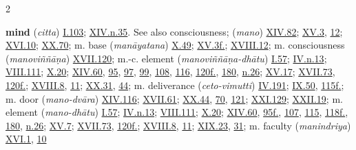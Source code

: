 \begin{multicols}{2}
\begin{vismHanging}
\par\textbf{mind} (\emph{citta}) \hyperlink{I.103}{I.103}{}; \hyperlink{XIV.n35}{XIV.n.35}{}. See also consciousness; (\emph{mano}) \hyperlink{XIV.82}{XIV.82}{}; \hyperlink{XV.3}{XV.3}{}, \hyperlink{XV.12}{12}{}; \hyperlink{XVI.10}{XVI.10}{}; \hyperlink{XX.70}{XX.70}{}; m. base (\emph{manāyatana}) \hyperlink{X.49}{X.49}{}; \hyperlink{XV.3}{XV.3f.}{}; \hyperlink{XVIII.12}{XVIII.12}{}; m. consciousness (\emph{manoviññāṇa}) \hyperlink{XVII.120}{XVII.120}{}; m.-c. element (\emph{manoviññāṇa-dhātu}) \hyperlink{I.57}{I.57}{}; \hyperlink{IV.n13}{IV.n.13}{}; \hyperlink{VIII.111}{VIII.111}{}; \hyperlink{X.20}{X.20}{}; \hyperlink{XIV.60}{XIV.60}{}, \hyperlink{XIV.95}{95}{}, \hyperlink{XIV.97}{97}{}, \hyperlink{XIV.99}{99}{}, \hyperlink{XIV.108}{108}{}, \hyperlink{XIV.116}{116}{}, \hyperlink{XIV.120}{120f.}{}, \hyperlink{XIV.180}{180}{}, \hyperlink{XIV.n26}{n.26}{}; \hyperlink{XV.17}{XV.17}{}; \hyperlink{XVII.73}{XVII.73}{}, \hyperlink{XVII.120}{120f.}{}; \hyperlink{XVIII.8}{XVIII.8}{}, \hyperlink{XVIII.11}{11}{}; \hyperlink{XX.31}{XX.31}{}, \hyperlink{XX.44}{44}{}; m. deliverance (\emph{ceto-vimutti}) \hyperlink{IV.191}{IV.191}{}; \hyperlink{IX.50}{IX.50}{}, \hyperlink{IX.115}{115f.}{}; m. door (\emph{mano-dvāra}) \hyperlink{XIV.116}{XIV.116}{}; \hyperlink{XVII.61}{XVII.61}{}; \hyperlink{XX.44}{XX.44}{}, \hyperlink{XX.70}{70}{}, \hyperlink{XX.121}{121}{}; \hyperlink{XXI.129}{XXI.129}{}; \hyperlink{XXII.19}{XXII.19}{}; m. element (\emph{mano-dhātu}) \hyperlink{I.57}{I.57}{}; \hyperlink{IV.n13}{IV.n.13}{}; \hyperlink{VIII.111}{VIII.111}{}; \hyperlink{X.20}{X.20}{}; \hyperlink{XIV.60}{XIV.60}{}, \hyperlink{XIV.95}{95f.}{}, \hyperlink{XIV.107}{107}{}, \hyperlink{XIV.115}{115}{}, \hyperlink{XIV.118}{118f.}{}, \hyperlink{XIV.180}{180}{}, \hyperlink{XIV.n26}{n.26}{}; \hyperlink{XV.7}{XV.7}{}; \hyperlink{XVII.73}{XVII.73}{}, \hyperlink{XVII.120}{120f.}{}; \hyperlink{XVIII.8}{XVIII.8}{}, \hyperlink{XVIII.11}{11}{}; \hyperlink{XIX.23}{XIX.23}{}, \hyperlink{XIX.31}{31}{}; m. faculty (\emph{manindriya}) \hyperlink{XVI.1}{XVI.1}{}, \hyperlink{XVI.10}{10}{}

\end{vismHanging}
\end{multicols}
